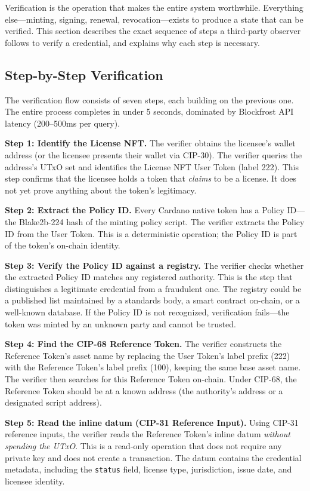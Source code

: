 Verification is the operation that makes the entire system worthwhile. Everything else---minting, signing, renewal, revocation---exists to produce a state that can be verified. This section describes the exact sequence of steps a third-party observer follows to verify a credential, and explains why each step is necessary.

\subsection{Step-by-Step Verification}

The verification flow consists of seven steps, each building on the previous one. The entire process completes in under 5 seconds, dominated by Blockfrost API latency (200--500ms per query).

\textbf{Step 1: Identify the License NFT.} The verifier obtains the licensee's wallet address (or the licensee presents their wallet via CIP-30). The verifier queries the address's UTxO set and identifies the License NFT User Token (label 222). This step confirms that the licensee holds a token that \emph{claims} to be a license. It does not yet prove anything about the token's legitimacy.

\textbf{Step 2: Extract the Policy ID.} Every Cardano native token has a Policy ID---the Blake2b-224 hash of the minting policy script. The verifier extracts the Policy ID from the User Token. This is a deterministic operation; the Policy ID is part of the token's on-chain identity.

\textbf{Step 3: Verify the Policy ID against a registry.} The verifier checks whether the extracted Policy ID matches any registered authority. This is the step that distinguishes a legitimate credential from a fraudulent one. The registry could be a published list maintained by a standards body, a smart contract on-chain, or a well-known database. If the Policy ID is not recognized, verification fails---the token was minted by an unknown party and cannot be trusted.

\textbf{Step 4: Find the CIP-68 Reference Token.} The verifier constructs the Reference Token's asset name by replacing the User Token's label prefix (222) with the Reference Token's label prefix (100), keeping the same base asset name. The verifier then searches for this Reference Token on-chain. Under CIP-68, the Reference Token should be at a known address (the authority's address or a designated script address).

\textbf{Step 5: Read the inline datum (CIP-31 Reference Input).} Using CIP-31 reference inputs, the verifier reads the Reference Token's inline datum \emph{without spending the UTxO}. This is a read-only operation that does not require any private key and does not create a transaction. The datum contains the credential metadata, including the \texttt{status} field, license type, jurisdiction, issue date, and licensee identity.

